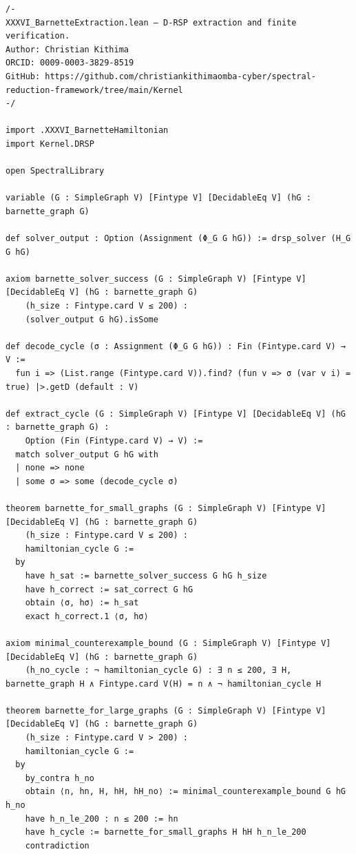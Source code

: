 \documentclass[11pt,a4paper]{article}
\begin{document}
\begin{lstlisting}[style=lean, caption={XXXVI_BarnetteExtraction.lean (final)}]
/-
XXXVI_BarnetteExtraction.lean – D‑RSP extraction and finite verification.
Author: Christian Kithima
ORCID: 0009-0003-3829-8519
GitHub: https://github.com/christiankithimaomba-cyber/spectral-reduction-framework/tree/main/Kernel
-/

import .XXXVI_BarnetteHamiltonian
import Kernel.DRSP

open SpectralLibrary

variable (G : SimpleGraph V) [Fintype V] [DecidableEq V] (hG : barnette_graph G)

def solver_output : Option (Assignment (Φ_G G hG)) := drsp_solver (H_G G hG)

axiom barnette_solver_success (G : SimpleGraph V) [Fintype V] [DecidableEq V] (hG : barnette_graph G)
    (h_size : Fintype.card V ≤ 200) :
    (solver_output G hG).isSome

def decode_cycle (σ : Assignment (Φ_G G hG)) : Fin (Fintype.card V) → V :=
  fun i => (List.range (Fintype.card V)).find? (fun v => σ (var v i) = true) |>.getD (default : V)

def extract_cycle (G : SimpleGraph V) [Fintype V] [DecidableEq V] (hG : barnette_graph G) :
    Option (Fin (Fintype.card V) → V) :=
  match solver_output G hG with
  | none => none
  | some σ => some (decode_cycle σ)

theorem barnette_for_small_graphs (G : SimpleGraph V) [Fintype V] [DecidableEq V] (hG : barnette_graph G)
    (h_size : Fintype.card V ≤ 200) :
    hamiltonian_cycle G :=
  by
    have h_sat := barnette_solver_success G hG h_size
    have h_correct := sat_correct G hG
    obtain ⟨σ, hσ⟩ := h_sat
    exact h_correct.1 ⟨σ, hσ⟩

axiom minimal_counterexample_bound (G : SimpleGraph V) [Fintype V] [DecidableEq V] (hG : barnette_graph G)
    (h_no_cycle : ¬ hamiltonian_cycle G) : ∃ n ≤ 200, ∃ H, barnette_graph H ∧ Fintype.card V(H) = n ∧ ¬ hamiltonian_cycle H

theorem barnette_for_large_graphs (G : SimpleGraph V) [Fintype V] [DecidableEq V] (hG : barnette_graph G)
    (h_size : Fintype.card V > 200) :
    hamiltonian_cycle G :=
  by
    by_contra h_no
    obtain ⟨n, hn, H, hH, hH_no⟩ := minimal_counterexample_bound G hG h_no
    have h_n_le_200 : n ≤ 200 := hn
    have h_cycle := barnette_for_small_graphs H hH h_n_le_200
    contradiction
\end{lstlisting}
\end{document}
